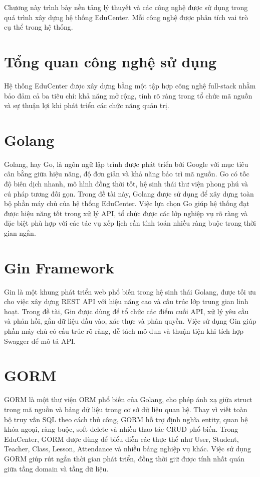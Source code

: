 \documentclass[../DoAn.tex]{subfiles}
\begin{document}
Chương này trình bày nền tảng lý thuyết và các công nghệ được sử dụng trong quá trình xây dựng hệ thống EduCenter. Mỗi công nghệ được phân tích vai trò cụ thể trong hệ thống.

\section{Tổng quan công nghệ sử dụng}
\label{section:3.1}
Hệ thống EduCenter được xây dựng bằng một tập hợp công nghệ full-stack nhằm bảo đảm cả ba tiêu chí: khả năng mở rộng, tính rõ ràng trong tổ chức mã nguồn và sự thuận lợi khi phát triển các chức năng quản trị.

\section{Golang}
\label{section:3.2}
Golang, hay Go, là ngôn ngữ lập trình được phát triển bởi Google với mục tiêu cân bằng giữa hiệu năng, độ đơn giản và khả năng bảo trì mã nguồn. Go có tốc độ biên dịch nhanh, mô hình đồng thời tốt, hệ sinh thái thư viện phong phú và cú pháp tương đối gọn. Trong đề tài này, Golang được sử dụng để xây dựng toàn bộ phần máy chủ của hệ thống EduCenter. Việc lựa chọn Go giúp hệ thống đạt được hiệu năng tốt trong xử lý API, tổ chức được các lớp nghiệp vụ rõ ràng và đặc biệt phù hợp với các tác vụ xếp lịch cần tính toán nhiều ràng buộc trong thời gian ngắn.

\section{Gin Framework}
\label{section:3.3}
Gin là một khung phát triển web phổ biến trong hệ sinh thái Golang, được tối ưu cho việc xây dựng REST API với hiệu năng cao và cấu trúc lớp trung gian linh hoạt. Trong đề tài, Gin được dùng để tổ chức các điểm cuối API, xử lý yêu cầu và phản hồi, gắn dữ liệu đầu vào, xác thực và phân quyền. Việc sử dụng Gin giúp phần máy chủ có cấu trúc rõ ràng, dễ tách mô-đun và thuận tiện khi tích hợp Swagger để mô tả API.

\section{GORM}
\label{section:3.4}
GORM là một thư viện ORM phổ biến của Golang, cho phép ánh xạ giữa struct trong mã nguồn và bảng dữ liệu trong cơ sở dữ liệu quan hệ. Thay vì viết toàn bộ truy vấn SQL theo cách thủ công, GORM hỗ trợ định nghĩa entity, quan hệ khóa ngoại, ràng buộc, soft delete và nhiều thao tác CRUD phổ biến. Trong EduCenter, GORM được dùng để biểu diễn các thực thể như User, Student, Teacher, Class, Lesson, Attendance và nhiều bảng nghiệp vụ khác. Việc sử dụng GORM giúp rút ngắn thời gian phát triển, đồng thời giữ được tính nhất quán giữa tầng domain và tầng dữ liệu.
\end{document}
